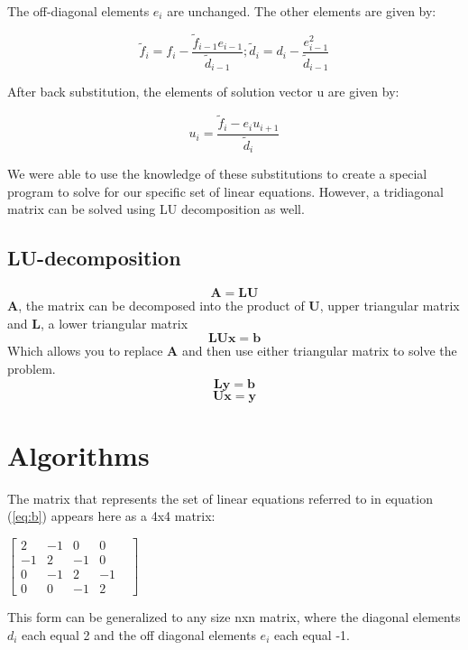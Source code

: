 \documentclass[10pt,showpacs,preprintnumbers,footinbib,amsmath,amssymb,aps,prl,twocolumn,groupedaddress,superscriptaddress,showkeys]{revtex4-1}
\begin{document}
The off-diagonal elements $e_{i}$ are unchanged. The other elements are given by:

	\begin{equation}
        \label{eq:f}
	\tilde{f}_{i}=f_{i}-\frac{\tilde{f}_{i-1}e_{i-1}}{\tilde{d}_{i-1}} ; \tilde{d}_{i}=d_{i}-\frac{e^{2}_{i-1}}{\tilde{d}_{i-1}}
	\end{equation}
	
After back substitution, the elements of solution vector u are given by:

	\begin{equation}
        \label{eq:g}
	u_{i} = \frac{\tilde{f}_{i}-e_{i}u_{i+1}}{\tilde{d}_{i}}
	\end{equation}

We were able to use the knowledge of these substitutions to create a special program to solve for our specific set of linear equations.  However, a tridiagonal matrix can be solved using LU decomposition as well.
	
	\subsection{LU-decomposition}
	
	\begin{equation} \mathbf{A=LU} \end{equation}
$\mathbf{A}$, the matrix can be decomposed into the product of  $\mathbf{U}$, upper triangular matrix and $\mathbf{L}$, a lower triangular matrix
	\begin{equation} \mathbf{LUx=b} \end{equation}
	Which allows you to replace $\mathbf{A}$ and then use either triangular matrix to solve the problem.
	\begin{equation}\label{eq:i} \mathbf{Ly=b} \end{equation}
	\begin{equation}\label{eq:j} \mathbf{Ux=y} \end{equation}
\section{Algorithms} \label{sec:algo}	

The matrix that represents the set of linear equations referred to in equation (\ref{eq:b}) appears here as a 4x4 matrix:
\begin{center}
		$\begin{bmatrix}
			2 & -1 & 0 & 0 \\
			-1 & 2 & -1 & 0 & \\
			0 & -1 & 2 & -1   \\
			0 & 0 & -1 & 2 
		\end{bmatrix}$
		 
		\end{center}
This form can be generalized to any size nxn matrix, where the diagonal elements $d_{i}$ each equal 2 and the off diagonal elements $e_{i}$ each equal -1.
\end{document}

